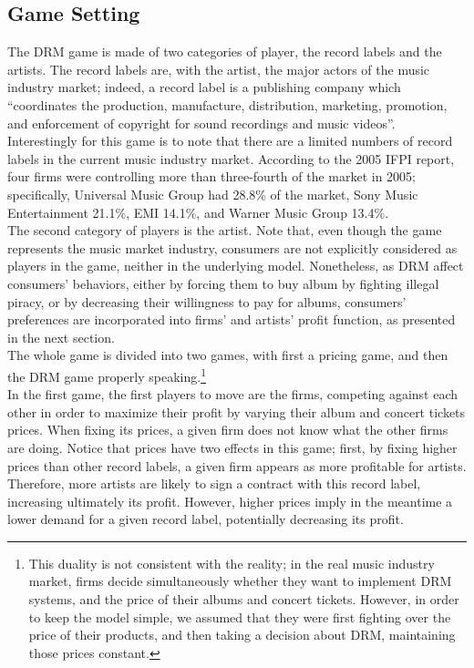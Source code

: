 \documentclass[a4paper,12pt]{article}
\numberwithin{equation}{section}
\begin{document}
\subsection{Game Setting}

The DRM game is made of two categories of player, the record labels and the artists. The record labels are, with the artist, the major actors of the music industry market; indeed, a record label is a publishing company which ``coordinates the production, manufacture, distribution, marketing, promotion, and enforcement of copyright for sound recordings and music videos''\cite{klein2014}. Interestingly for this game is to note that there are a limited numbers of record labels in the current music industry market. According to the 2005 IFPI report, four firms were controlling more than three-fourth of the market in 2005; specifically, Universal Music Group had 28.8\% of the market, Sony Music Entertainment 21.1\%, EMI 14.1\%, and Warner Music Group 13.4\%.\\

The second category of players is the artist. Note that, even though the game represents the music market industry, consumers are not explicitly considered as players in the game, neither in the underlying model. Nonetheless, as DRM affect consumers' behaviors, either by forcing them to buy album by fighting illegal piracy, or by decreasing their willingness to pay for albums, consumers' preferences are incorporated into firms' and artists' profit function, as presented in the next section.\\

The whole game is divided into two games, with first a pricing game, and then the DRM game properly speaking.\footnote{
This duality is not consistent with the reality; in the real music industry market, firms decide simultaneously whether they want to implement DRM systems, and the price of their albums and concert tickets. However, in order to keep the model simple, we assumed that they were first fighting over the price of their products, and then taking a decision about DRM, maintaining those prices constant.
}\\

In the first game, the first players to move are the firms, competing against each other in order to maximize their profit by varying their album and concert tickets prices. When fixing its prices, a given firm does not know what the other firms are doing. Notice that prices have two effects in this game; first, by fixing higher prices than other record labels, a given firm appears as more profitable for artists. Therefore, more artists are likely to sign a contract with this record label, increasing ultimately its profit. However, higher prices imply in the meantime a lower demand for a given record label, potentially decreasing its profit.\\
\end{document}
